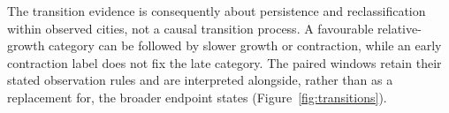 The transition evidence is consequently about persistence and reclassification within observed cities, not a causal transition process. A favourable relative-growth category can be followed by slower growth or contraction, while an early contraction label does not fix the late category. The paired windows retain their stated observation rules and are interpreted alongside, rather than as a replacement for, the broader endpoint states (Figure~\ref{fig:transitions}).

